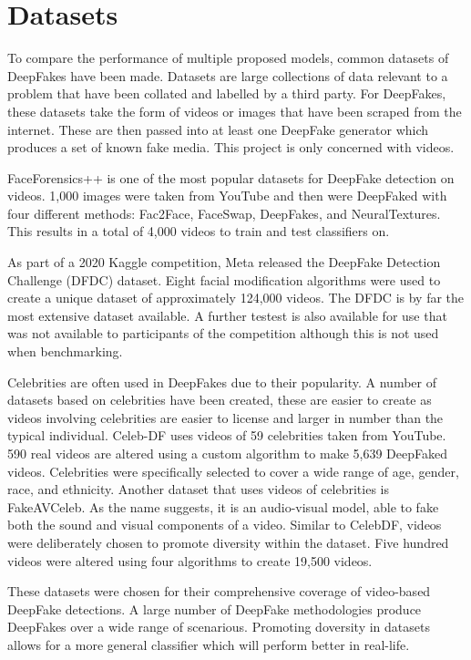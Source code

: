 \section{Datasets}
\label{sec:datasets}

To compare the performance of multiple proposed models, common datasets of DeepFakes have been made. Datasets are large collections of data relevant to a problem that have been collated and labelled by a third party. For DeepFakes, these datasets take the form of videos or images that have been scraped from the internet. These are then passed into at least one DeepFake generator which produces a set of known fake media. This project is only concerned with videos.

FaceForensics++\cite{roessler2018faceforensics}\cite{roessler2019faceforensicspp}\cite{dufour2019deepfakes} is one of the most popular datasets for DeepFake detection on videos. 1,000 images were taken from YouTube and then were DeepFaked with four different methods: Fac2Face\cite{thies2016face2face}, FaceSwap\cite{kowalski2016faceswap}, DeepFakes\cite{deepfakes}, and NeuralTextures\cite{thies2019deferred}. This results in a total of 4,000 videos to train and test classifiers on. 

As part of a 2020 Kaggle competition, Meta released the DeepFake Detection Challenge (DFDC) dataset\cite{dolhansky2020deepfake}. Eight facial modification algorithms were used to create a unique dataset of approximately 124,000 videos. The DFDC is by far the most extensive dataset available. A further testest is also available for use that was not available to participants of the competition although this is not used when benchmarking.

Celebrities are often used in DeepFakes due to their popularity. A number of datasets based on celebrities have been created, these are easier to create as videos involving celebrities are easier to license and larger in number than the typical individual. Celeb-DF\cite{li2020celeb} uses videos of 59 celebrities taken from YouTube. 590 real videos are altered using a custom algorithm to make 5,639 DeepFaked videos. Celebrities were specifically selected to cover a wide range of age, gender, race, and ethnicity. Another dataset that uses videos of celebrities is FakeAVCeleb\cite{khalid2021fakeavceleb}. As the name suggests, it is an audio-visual model, able to fake both the sound and visual components of a video. Similar to CelebDF, videos were deliberately chosen to promote diversity within the dataset. Five hundred videos were altered using four algorithms to create 19,500 videos.

These datasets were chosen for their comprehensive coverage of video-based DeepFake detections. A large number of DeepFake methodologies produce DeepFakes over a wide range of scenarious. Promoting doversity in datasets allows for a more general classifier which will perform better in real-life.